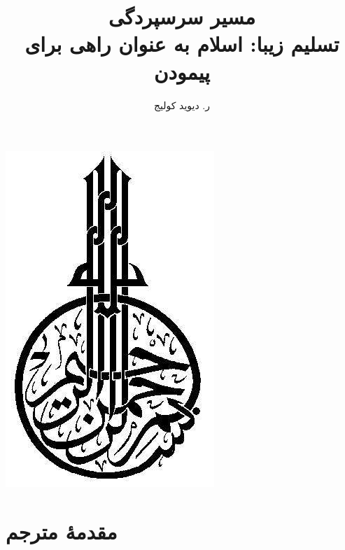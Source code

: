 \documentclass[14pt,oneside]{memoir} %
\title{مسیر سرسپردگی
	\\
	{\small
		تسلیم زیبا: اسلام به عنوان راهی برای پیمودن
}}
\author{ر. دیوید کولیج
}
\date{}
\begin{document}
\clearpage{}


  \frontmatter
  
\thispagestyle{empty} 
\maketitle\clearpage{}
\newpage %

  \clearpage{}
\thispagestyle{empty} 
\begin{center}
	\includegraphics[height=0.3\textheight]{besm}
\end{center}
\newpage %

\begin{KeepFromToc}
	\tableofcontents
\end{KeepFromToc}
%
\chapter*{مقدمهٔ مترجم}
 \justify
 


\chapter*{}

  
\end{document}
